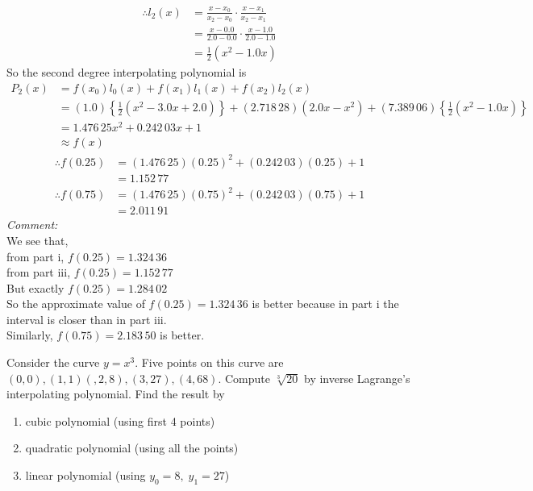 \documentclass[12pt,class=book,crop=false]{standalone}
\begin{document}
\begin{soln}
    \begin{align*}
        \therefore l_2(x) & = \frac{x-x_0}{x_2-x_0}\cdot\frac{x-x_1}{x_2-x_1} \\
                          & = \frac{x-0.0}{2.0-0.0}\cdot\frac{x-1.0}{2.0-1.0} \\
                          & = \frac{1}{2}(x^2-1.0x)
    \end{align*}
    So the second degree interpolating polynomial is
    \begin{align*}
        P_2(x) & = f(x_0)l_0(x)+f(x_1)l_1(x)+f(x_2)l_2(x)                                                                          \\
               & = (1.0)\left\{\frac{1}{2}(x^2-3.0x+2.0)\right\}+(2.718\,28)(2.0x-x^2)+(7.389\,06)\left\{\frac{1}{2}(x^2-1.0x)\right\} \\
               & =1.476\,25x^2+0.242\,03x+1                                                                                            \\
               & \approx f(x)
    \end{align*}
    \begin{align*}
        \therefore f(0.25) & = (1.476\,25)(0.25)^2+(0.242\,03)(0.25)+1 \\
                           & =1.152\,77
    \end{align*}
    \begin{align*}
        \therefore f(0.75) & = (1.476\,25)(0.75)^2+(0.242\,03)(0.75)+1 \\
                           & =2.011\,91
    \end{align*}
    \emph{Comment:}\\
    We see that,\\
    \indent from part i, \(  f(0.25)=1.324\,36 \)\\
    \indent from part iii, \(  f(0.25)=1.152\,77 \)\\
    But exactly \(  f(0.25)=1.284\,02 \)\\
    So the approximate value of \(  f(0.25)=1.324\,36 \) is better because in part i the interval is closer than in part iii.\\
    Similarly, \(  f(0.75)=2.183\,50 \) is better.
\end{soln}
\begin{prob}
    Consider the curve \(  y=x^3 \). Five points on this curve are \(  (0,0), (1,1)(,2,8),(3,27),(4,68) \). Compute \(  \sqrt[3]{20} \) by inverse Lagrange's interpolating polynomial. Find the result by
    \begin{enumerate}
        \item cubic polynomial (using first 4 points)
        \item quadratic polynomial (using all the points)
        \item linear polynomial (using \(  y_0=8,\;y_1=27 \))
    \end{enumerate}
\end{prob}
\end{document}
